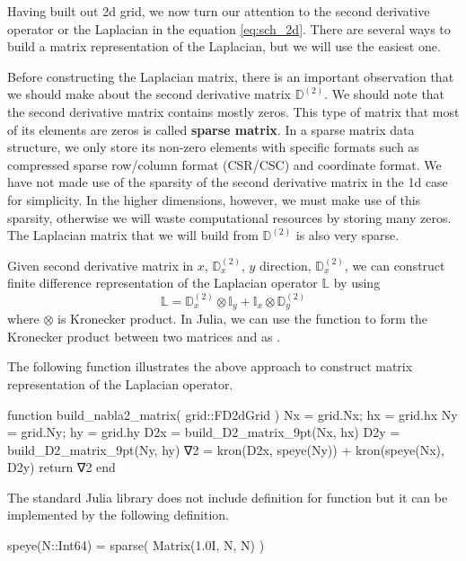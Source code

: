 Having built out 2d grid, we now turn our attention to the second derivative operator or
the Laplacian in the equation \ref{eq:sch_2d}.
There are several ways to build a matrix representation of the Laplacian, but we will
use the easiest one. 

Before constructing the Laplacian matrix, there is an important observation that
we should make about the second derivative matrix $\mathbb{D}^{(2)}$. We should note
that the second derivative matrix contains mostly zeros. This type of matrix that
most of its elements are zeros is called \textbf{sparse matrix}.
In a sparse matrix data structure, we only store its non-zero elements with specific
formats such as compressed sparse row/column format (CSR/CSC) and coordinate format.
We have not made use of the sparsity of the second derivative matrix
in the 1d case for simplicity. In the higher dimensions, however,
we must make use of this sparsity, otherwise we will waste computational resources 
by storing many zeros. The Laplacian matrix that we will build from
$\mathbb{D}^{(2)}$ is also very sparse.

Given second derivative matrix in $x$, $\mathbb{D}^{(2)}_{x}$,
$y$ direction, $\mathbb{D}^{(2)}_{x}$,
we can construct finite difference representation of the Laplacian operator
$\mathbb{L}$ by using
%
\begin{equation}
\mathbb{L} = \mathbb{D}^{(2)}_{x} \otimes \mathbb{I}_{y} +
\mathbb{I}_{x} \otimes \mathbb{D}^{(2)}_{y}
\end{equation}
%
where $\otimes$ is Kronecker product.
In Julia, we can use the function  to form the Kronecker product
between two matrices  and  as .

The following function illustrates the above approach to construct matrix
representation of the Laplacian operator.
\begin{juliacode}
function build_nabla2_matrix( grid::FD2dGrid )
  Nx = grid.Nx; hx = grid.hx
  Ny = grid.Ny; hy = grid.hy
  D2x = build_D2_matrix_9pt(Nx, hx)
  D2y = build_D2_matrix_9pt(Ny, hy)
  ∇2 = kron(D2x, speye(Ny)) + kron(speye(Nx), D2y)
  return ∇2
end
\end{juliacode}

The standard Julia library does not include definition for  function
but it can be implemented by the following definition.
\begin{juliacode}
speye(N::Int64) = sparse( Matrix(1.0I, N, N) )
\end{juliacode}


